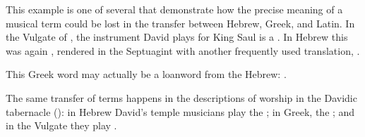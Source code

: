 This example is one of several that demonstrate how the precise meaning of a
musical term could be lost in the transfer between Hebrew, Greek, and Latin.
In the Vulgate of , the instrument David plays for King
Saul is a .
In Hebrew this was again , rendered in the Septuagint with another
frequently used translation, .%
\begin{Footnote}
    This Greek word may actually be a loanword from the Hebrew:
    \autocite[]{Brown:HebrewOTLexicon}.
\end{Footnote}
The same transfer of terms happens in the descriptions of worship in the
Davidic tabernacle (): in Hebrew David's
temple musicians play the ; in Greek, the ;
and in the Vulgate they play .


